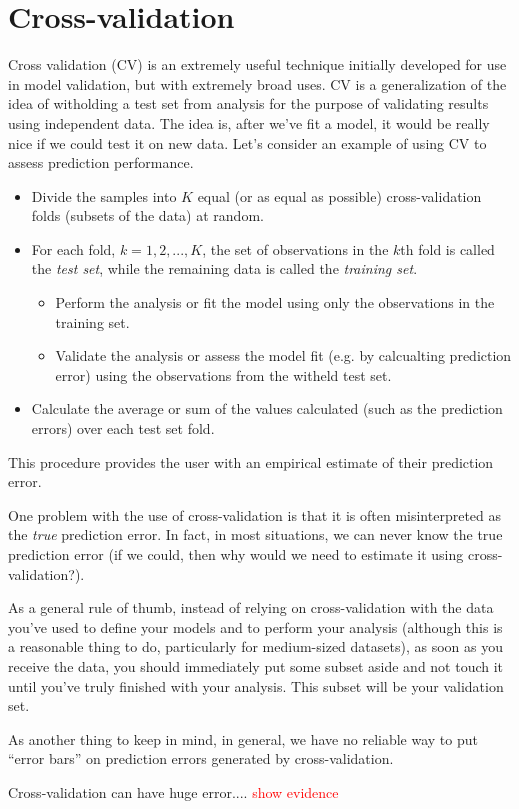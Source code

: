

\chapter{Cross-validation}
\label{ch:cv}


Cross validation (CV) is an extremely useful technique initially developed for use in model validation, but with extremely broad uses. CV is a generalization of the idea of witholding a test set from analysis for the purpose of validating results using independent data. The idea is, after we've fit a model, it would be really nice if we could test it on new data. Let's consider an example of using CV to assess prediction performance.

\begin{itemize}
\item Divide the samples into $K$ equal (or as equal as possible) cross-validation folds (subsets of the data) at random.
\item For each fold, $k = 1, 2, ..., K$, the set of observations in the $k$th fold is called the \emph{test set}, while the remaining data is called the \emph{training set}.
\begin{itemize}
\item Perform the analysis or fit the model using only the observations in the training set.
\item  Validate the analysis or assess the model fit (e.g. by calcualting prediction error) using the observations from the witheld test set.
\end{itemize}
\item Calculate the average or sum of the values calculated (such as the prediction errors) over each test set fold.
\end{itemize}





This procedure provides the user with an empirical estimate of their prediction error.



One problem with the use of cross-validation is that it is often misinterpreted as the \emph{true} prediction error. In fact, in most situations, we can never know the true prediction error (if we could, then why would we need to estimate it using cross-validation?).


As a general rule of thumb, instead of relying on cross-validation with the data you've used to define your models and to perform your analysis (although this is a reasonable thing to do, particularly for medium-sized datasets), as soon as you receive the data, you should immediately put some subset aside and not touch it until you've truly finished with your analysis. This subset will be your validation set.


As another thing to keep in mind, in general, we have no reliable way to put ``error bars'' on prediction errors generated by cross-validation.

Cross-validation can have huge error.... \textcolor{red}{show evidence}
